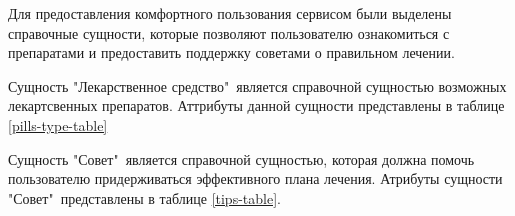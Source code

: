     Для предоставления комфортного пользования сервисом были выделены справочные сущности, %
    которые позволяют пользователю ознакомиться с препаратами и предоставить поддержку советами %
    о правильном лечении.

    Сущность "Лекарственное средство"\ является справочной сущностью возможных %
    лекартсвенных препаратов. Аттрибуты данной сущности представлены в %
    таблице \ref{pills-type-table}

    \begin{table}[H]
        \caption{Описание атрибутов сущности "Лекарственное средство".}
        \label{pills-type-table}
    \end{table}

    Сущность "Совет"\ является справочной сущностью, которая должна помочь пользователю %
    придерживаться эффективного плана лечения. Атрибуты сущности "Совет"\ представлены в %
    таблице \ref{tips-table}.
    
    \begin{table}[H]
        \caption{Описание атрибутов сущности "Совет".}
        \label{tips-table}
    \end{table}

